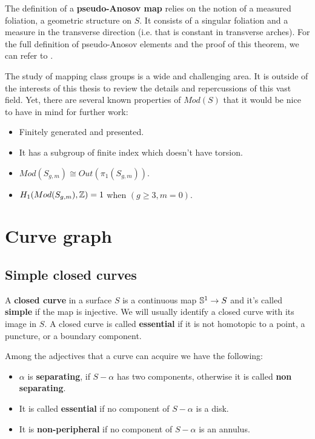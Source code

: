 The definition of a \textbf{pseudo-Anosov map} relies on the notion of a measured foliation, a geometric structure on $S$. It consists of a singular foliation and a measure in the transverse direction (i.e. that is constant in transverse arches). For the full definition of pseudo-Anosov elements and the proof of this theorem, we can refer to \cite[Farb, ch.~13]{Farb}.

The study of mapping class groups is a wide and challenging area. It is outside of the interests of this thesis to review the details and repercussions of this vast field. Yet, there are several known properties of $Mod(S)$ that it would be nice to have in mind for further work:

\begin{itemize}
\item Finitely generated and presented.
\item It has a subgroup of finite index which doesn't have torsion.
\item $Mod(S_{g,m}) \cong Out(\pi_{1}(S_{g,m}))$.
\item $H_{1}(Mod(S_{g,m}), \Z) = 1$ when $(g\geq3, m=0)$.
\end{itemize}

\section{Curve graph}

\subsection{Simple closed curves}

\begin{defini}
A \textbf{closed curve} in a surface $S$ is a continuous map $\S^{1}\to S$ and it's called \textbf{simple} if the map is injective. We will usually identify a closed curve with its image in $S$. A closed curve is called \textbf{essential} if it is not homotopic to a point, a puncture, or a boundary component.
\end{defini}
Among the adjectives that a curve can acquire we have the following:
\begin{itemize}
    \item $\alpha$ is \textbf{separating}, if $S-\alpha$ has two components, otherwise it is called \textbf{non separating}.
    \item It is called \textbf{essential} if no component of $S- \alpha$ is a disk.
    \item It is \textbf{non-peripheral} if no component of $S - \alpha$ is an annulus. 
\end{itemize}


